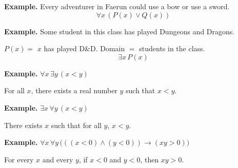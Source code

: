 \documentclass{article}
\begin{document}
\bigskip

\textbf{Example.} Every adventurer in Faerun could use a bow or use a sword.
\[
\forall x \, (P(x) \lor Q(x))
\]

\bigskip

\textbf{Example.} Some student in this class has played Dungeons and Dragons.

\medskip

$P(x) = $ $x$ has played D\&D. \quad Domain $=$ students in the class.
\[
\exists x \, P(x)
\]

\bigskip

\textbf{Example.} $\forall x \, \exists y \, (x < y)$

\medskip

For all $x$, there exists a real number $y$ such that $x < y$.

\bigskip

\textbf{Example.} $\exists x \, \forall y \, (x < y)$

\medskip

There exists $x$ such that for all $y$, $x < y$.

\bigskip

\textbf{Example.} $\forall x \, \forall y \, \big( ((x < 0) \land (y < 0)) \to (xy > 0) \big)$

\medskip

For every $x$ and every $y$, if $x < 0$ and $y < 0$, then $xy > 0$.
\end{document}
